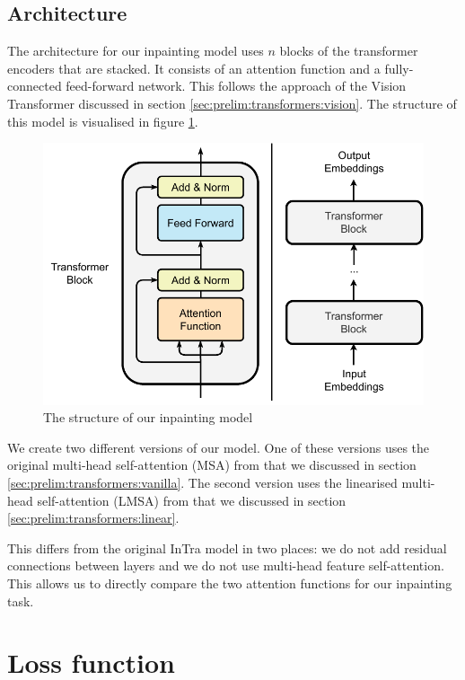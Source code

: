 \subsection{Architecture}

The architecture for our inpainting model uses $n$ blocks of the transformer encoders that are stacked.
It consists of an attention function and a fully-connected feed-forward network. This follows the approach of the Vision Transformer discussed in section \ref{sec:prelim:transformers:vision}. The structure of this model is visualised in figure \ref{fig:experimental-setup:model-structure}.

\begin{figure}[ht!]
\centering
\includegraphics[width=\textwidth]{imgs/model-structure.pdf}
\caption{The structure of our inpainting model}
\label{fig:experimental-setup:model-structure}
\end{figure}

We create two different versions of our model. One of these versions uses the original multi-head self-attention (MSA) from \cite{vaswani_attention_2017} that we discussed in section \ref{sec:prelim:transformers:vanilla}. The second version uses the linearised multi-head self-attention (LMSA) from \cite{katharopoulos_transformers_2020} that we discussed in section \ref{sec:prelim:transformers:linear}.

This differs from the original InTra model in two places: we do not add residual connections between layers and we do not use multi-head feature self-attention. This allows us to directly compare the two attention functions for our inpainting task.

\section{Loss function}
\label{sec:experimental-setup:loss}

